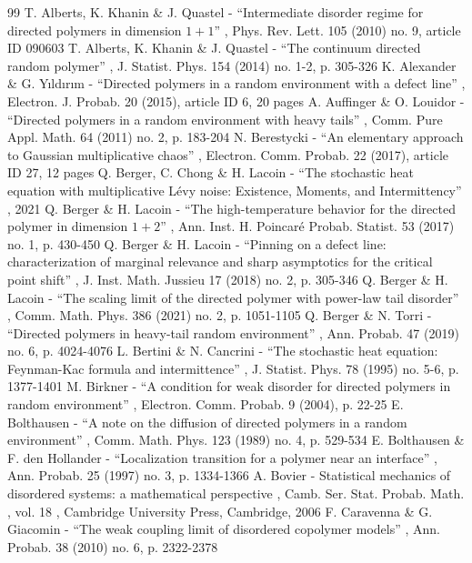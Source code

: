 \documentclass[11pt]{article}
\numberwithin{equation}{section}
\theoremstyle{definition}
\begin{document}
\begin{thebibliography}{99}
 T. Alberts, K. Khanin \& J. Quastel - “Intermediate disorder regime for directed polymers in dimension $1+1$” , Phys. Rev. Lett. 105 (2010) no. 9, article ID 090603
 T. Alberts, K. Khanin \& J. Quastel - “The continuum directed random polymer” , J. Statist. Phys. 154 (2014) no. 1-2, p. 305-326
 K. Alexander \& G. Yıldırım - “Directed polymers in a random environment with a defect line” , Electron. J. Probab. 20 (2015), article ID 6, 20 pages
 A. Auffinger \& O. Louidor - “Directed polymers in a random environment with heavy tails” , Comm. Pure Appl. Math. 64 (2011) no. 2, p. 183-204
 N. Berestycki - “An elementary approach to Gaussian multiplicative chaos” , Electron. Comm. Probab. 22 (2017), article ID 27, 12 pages
 Q. Berger, C. Chong \& H. Lacoin - “The stochastic heat equation with multiplicative Lévy noise: Existence, Moments, and Intermittency” , 2021
 Q. Berger \& H. Lacoin - “The high-temperature behavior for the directed polymer in dimension $1+2$” , Ann. Inst. H. Poincaré Probab. Statist. 53 (2017) no. 1, p. 430-450
 Q. Berger \& H. Lacoin - “Pinning on a defect line: characterization of marginal relevance and sharp asymptotics for the critical point shift” , J. Inst. Math. Jussieu 17 (2018) no. 2, p. 305-346
 Q. Berger \& H. Lacoin - “The scaling limit of the directed polymer with power-law tail disorder” , Comm. Math. Phys. 386 (2021) no. 2, p. 1051-1105
 Q. Berger \& N. Torri - “Directed polymers in heavy-tail random environment” , Ann. Probab. 47 (2019) no. 6, p. 4024-4076
 L. Bertini \& N. Cancrini - “The stochastic heat equation: Feynman-Kac formula and intermittence” , J. Statist. Phys. 78 (1995) no. 5-6, p. 1377-1401
 M. Birkner - “A condition for weak disorder for directed polymers in random environment” , Electron. Comm. Probab. 9 (2004), p. 22-25
 E. Bolthausen - “A note on the diffusion of directed polymers in a random environment” , Comm. Math. Phys. 123 (1989) no. 4, p. 529-534
 E. Bolthausen \& F. den Hollander - “Localization transition for a polymer near an interface” , Ann. Probab. 25 (1997) no. 3, p. 1334-1366
 A. Bovier - Statistical mechanics of disordered systems: a mathematical perspective , Camb. Ser. Stat. Probab. Math. , vol. 18 , Cambridge University Press, Cambridge, 2006
 F. Caravenna \& G. Giacomin - “The weak coupling limit of disordered copolymer models” , Ann. Probab. 38 (2010) no. 6, p. 2322-2378

\end{thebibliography}
\end{document}
